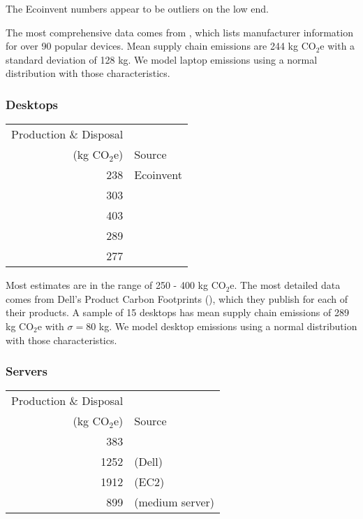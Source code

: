 \documentclass[11pt]{article}
\begin{document}
The Ecoinvent numbers appear to be outliers on the low end.

The most comprehensive data comes from \textcite{rarecoil}, which lists manufacturer
information for over 90 popular devices. Mean supply chain emissions are
244 kg CO$_2$e with a standard deviation of 128 kg. We model laptop emissions using a normal
distribution with those characteristics.

\subsubsection*{Desktops}

\begin{table}[h]
\centering
\begin{tabular}{|r|l|}
\hline
Production \& Disposal & \\
(kg CO$_2$e) & Source \\ \hline
238 & Ecoinvent \\ \hline
303 & \textcite{teehan2013} \\ \hline
403 & \textcite{unctadder2024} \\ \hline
289 & \textcite{dellpcf} \\ \hline
277 & \textcite{boavizta} \\ \hline
\end{tabular}
\label{tab:embodied_emissions:desktops}
\end{table}

Most estimates are in the range of 250 - 400 kg CO$_2$e. The most detailed data comes from
Dell's Product Carbon Footprints (\textcite{dellpcf}), which they publish for each of their products.
A sample of 15 desktops has mean supply chain emissions of 289 kg CO$_2$e with $\sigma = 80$ kg.
We model desktop emissions using a normal distribution with those characteristics.

\subsubsection*{Servers}

\begin{table}[h]
\centering
\begin{tabular}{|r|l|}
\hline
Production \& Disposal & \\
(kg CO$_2$e) & Source \\ \hline
383 & \textcite{teehan2013} \\ \hline
1252 & \textcite{davy2021} (Dell) \\ \hline
1912 & \textcite{davy2021} (EC2) \\ \hline
899 & \textcite{boavizta} (medium server)\\ \hline
\end{tabular}
\label{tab:embodied_emissions:servers}
\end{table}
\end{document}
